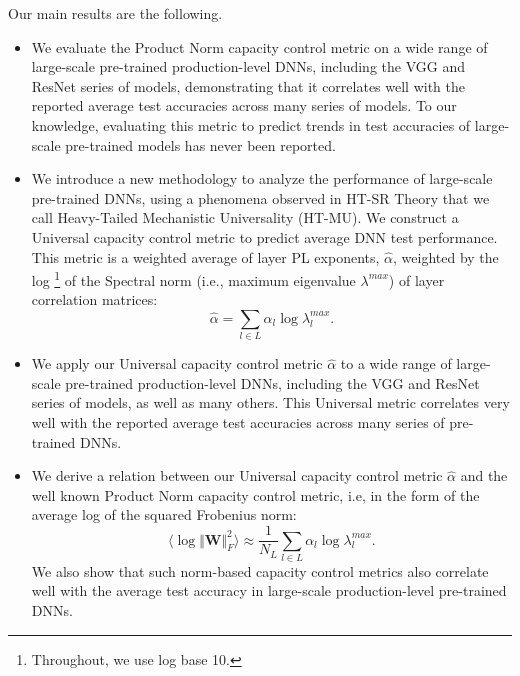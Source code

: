 Our main results are the following.
\begin{itemize}
\item
We evaluate the Product Norm capacity control metric on a wide range of large-scale pre-trained production-level DNNs, including the VGG and ResNet series of models, demonstrating that it correlates well with the reported average test accuracies across many series of models.
To our knowledge, evaluating this metric to predict trends in test accuracies of large-scale pre-trained models has never been reported.
\item
We introduce a new methodology to analyze the performance of large-scale pre-trained DNNs, using a phenomena observed in HT-SR Theory that we call Heavy-Tailed Mechanistic Universality (HT-MU).
We construct a Universal capacity control metric to predict average DNN test performance.
This metric is a weighted average of layer PL exponents, $\hat{\alpha}$, weighted by the log%
\footnote{Throughout, we use log base 10.}
of the Spectral norm (i.e., maximum eigenvalue $\lambda^{max}$) of layer correlation matrices: 
$$
\hat{\alpha}=\sum_{l\in L}\alpha_{l}\log\lambda_{l}^{max}  .
$$
\item
We apply our Universal capacity control metric $\hat{\alpha}$ to a wide range of large-scale pre-trained production-level DNNs, including the VGG and ResNet series of models, as well as many others.
This Universal metric correlates very well with the reported average test accuracies across many series of pre-trained DNNs.
\item
We derive a relation between our Universal capacity control metric $\hat{\alpha}$ and the well known Product Norm capacity control metric, i.e, in the form of the average log of the squared Frobenius norm:
$$
\langle\log\Vert\mathbf{W}\Vert^{2}_{F}\rangle\approx \frac{1}{N_L}\sum_{l\in L} \alpha_{l}\log\lambda_{l}^{max}  .
$$
We also show that
such norm-based capacity control metrics also correlate well with the average test accuracy in large-scale production-level pre-trained DNNs.
\end{itemize}

